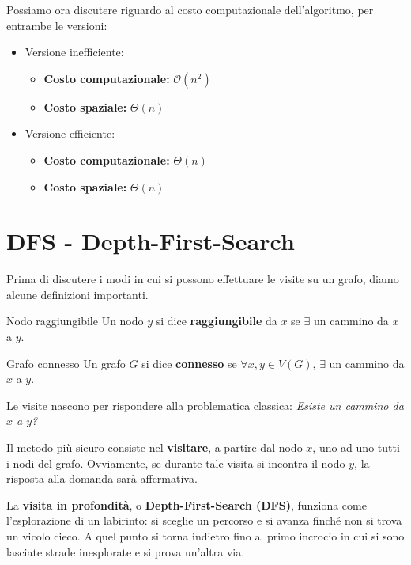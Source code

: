 \documentclass[12pt]{report}
\begin{document}
	Possiamo ora discutere riguardo al costo computazionale dell'algoritmo, per entrambe le versioni:
	\begin{itemize}
		\item Versione inefficiente:
		\begin{itemize}
			\item \textbf{Costo computazionale:} $\mathcal{O}(n^2)$
			\item \textbf{Costo spaziale:} $\Theta(n)$
		\end{itemize}
		
		\item Versione efficiente:
		\begin{itemize}
			\item \textbf{Costo computazionale:} $\Theta(n)$
			\item \textbf{Costo spaziale:} $\Theta(n)$
		\end{itemize}
	\end{itemize}
	
	\section{DFS - Depth-First-Search}
	Prima di discutere i modi in cui si possono effettuare le visite su un grafo, diamo alcune definizioni importanti.
	
	\begin{definizione}{Nodo raggiungibile}{}
		Un nodo $y$ si dice \textbf{raggiungibile} da $x$ se $\exists$ un cammino da $x$ a $y$.
	\end{definizione}
	
	\begin{definizione}{Grafo connesso}{}
		Un grafo $G$ si dice \textbf{connesso} se $\forall x, y \in V(G),\, \exists$ un cammino da $x$ a $y$.
	\end{definizione}
	
	Le visite nascono per rispondere alla problematica classica: \textit{Esiste un cammino da $x$ a $y$?}
	
	Il metodo più sicuro consiste nel \textbf{visitare}, a partire dal nodo $x$, uno ad uno tutti i nodi del grafo. Ovviamente, se durante tale visita si incontra il nodo $y$, la risposta alla domanda sarà affermativa.
	
	La \textbf{visita in profondità}, o \textbf{Depth-First-Search (DFS)}, funziona come l'esplorazione di un labirinto: si sceglie un percorso e si avanza finché non si trova un vicolo cieco. A quel punto si torna indietro fino al primo incrocio in cui si sono lasciate strade inesplorate e si prova un'altra via.
	
\end{document}
